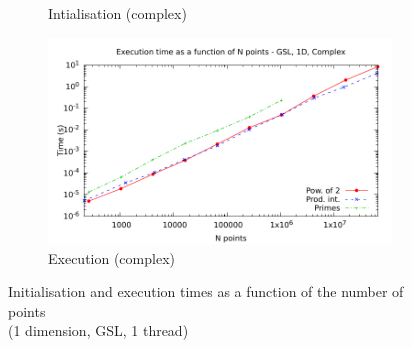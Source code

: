 \documentclass[12pt, a4paper]{article}
\begin{document}
\begin{figure}[H]
\begin{subfigure}{.5\textwidth}
\caption{Intialisation (complex)}
\label{1DGSLCI}
\end{subfigure}%
\begin{subfigure}{.5\textwidth}
\centering
\includegraphics[width=.9\linewidth]{graphs/1d-gsl-exec-c.pdf}
\caption{Execution (complex)}
\label{1DGSLC}
\end{subfigure}
\caption{Initialisation and execution times as a function of the number of points\\(1 dimension, GSL, 1 thread)}
\label{1DGSL}
\end{figure}
\end{document}
